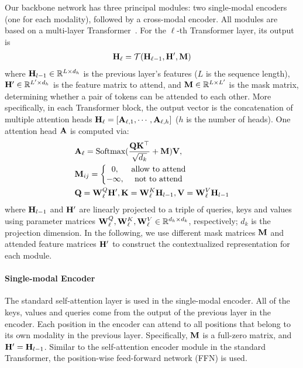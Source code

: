 \documentclass[10pt,twocolumn,letterpaper]{article}
\newcommand{\Amat}[0]{{{\bf A}}}
\newcommand{\Hmat}{{\bf H}}
\newcommand{\Kmat}[0]{{{\bf K}}\xspace}
\newcommand{\Mmat}{{\bf M}}
\newcommand{\Qmat}[0]{{{\bf Q}}\xspace}
\newcommand{\Vmat}[0]{{{\bf V}}}
\newcommand{\Wmat}[0]{{{\bf W}}}
\newcommand{\R}{\mathbb{R}}
\newcommand{\Tcal}{\mathcal{T}}
\begin{document}
Our backbone network has three principal modules: two single-modal encoders (one for each modality), followed by a cross-modal encoder. All modules are based on a multi-layer Transformer~\cite{vaswani2017attention}. For the $\ell$-th Transformer layer, its output is
\begin{align} 
\hspace{-0mm}
\Hmat_{\ell} =  \Tcal (\Hmat_{\ell - 1}, \Hmat^{\prime}, \Mmat ) 
\label{eq_visual_emb}
\end{align}
where $\Hmat_{l-1} \in \R^{ L \times d_h}$ is the previous layer's features ($L$ is the sequence length), $\Hmat^{\prime} \in \R^{ L^{\prime} \times d_h}$ is the feature matrix to attend, and $\Mmat \in \R^{ L \times L^{\prime}} $ is the mask matrix, determining whether a pair of tokens can be attended to each other.
More specifically, in each Transformer block, the output vector is the concatenation of multiple attention heads $\Hmat_{\ell} = [\Amat_{\ell, 1}, \cdots, \Amat_{\ell, h}]$ ($h$ is the number of heads). One attention head $\Amat$ is computed via:
\begin{align} 
\hspace{-0mm}
& \Amat_{\ell}  = \text{Softmax}( \frac{  \Qmat \Kmat^{\top} }{ \sqrt{d_k} } + \Mmat )  \Vmat,\\
& \Mmat_{ij} = \left\{\begin{matrix}
0, & \text{allow to attend} \\ 
-\infty,  &  \text{not to attend}
\end{matrix}\right.  \\
& \Qmat = \Wmat^Q_{\ell} \Hmat^{\prime},  \Kmat = \Wmat^{K}_{\ell} \Hmat_{l-1},  \Vmat = \Wmat^V_{\ell} \Hmat_{l-1}
\label{eq_visual_emb}
\end{align}
where  $\Hmat_{l-1}$ and $\Hmat^{\prime}$ are linearly projected to a triple of queries, keys and values using parameter matrices $\Wmat^Q_{\ell}, \Wmat^{K}_{\ell}, \Wmat^V_{\ell} \in \R^{d_h \times d_k} $, respectively; $d_k$ is the projection dimension.
In the following, we use different mask matrices $\Mmat$ and attended feature matrices $\Hmat'$ to construct the contextualized representation for each module.

\paragraph{Single-modal Encoder} The standard self-attention layer is used in the single-modal encoder. All of the keys, values and queries come from the output of the previous layer in the encoder. Each position in the encoder can attend to all positions that belong to its own modality in the previous layer.
Specifically, $\Mmat$ is a full-zero matrix, and $\Hmat' = \Hmat_{l-1}$. Similar to the self-attention encoder module in the standard Transformer, the position-wise feed-forward network (FFN) is used.
\end{document}
